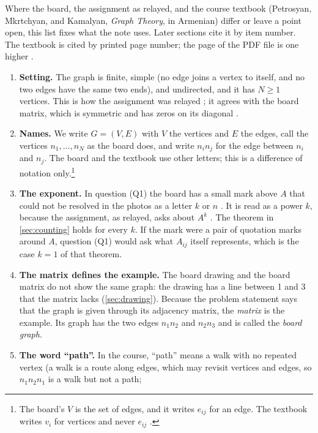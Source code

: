 Where the board, the assignment as relayed, and the course textbook
(Petrosyan, Mkrtchyan, and Kamalyan, \emph{Graph Theory}, in Armenian) differ
or leave a point open, this list fixes what the note uses. Later sections
cite it by item number. The textbook is cited by printed page number; the
page of the PDF file is one higher \cite{petrosyan2015graphs}.
\begin{enumerate}
\item\label{conv:setting} \textbf{Setting.} The graph is finite, simple (no
  edge joins a vertex to itself, and no two edges have the same two ends),
  and undirected, and it has $N\ge 1$ vertices. This is how the assignment
  was relayed \cite{userstatements}; it agrees with the board matrix, which
  is symmetric and has zeros on its diagonal \cite{whiteboard1}.
\item\label{conv:names} \textbf{Names.} We write $G=(V,E)$ with $V$ the
  vertices and $E$ the edges, call the vertices $n_1,\dots,n_N$ as the board
  does, and write $n_in_j$ for the edge between $n_i$ and $n_j$. The board
  and the textbook use other letters; this is a difference of notation
  only.\footnote{The board's $V$ is the set of edges, and it writes $e_{ij}$
  for an edge. The textbook writes $v_i$ for vertices and never $e_{ij}$
  \cite[p.~9]{petrosyan2015graphs}.}
\item\label{conv:power} \textbf{The exponent.} In question (Q1) the board has
  a small mark above $A$ that could not be resolved in the photos as a
  letter $k$ or $n$ \cite{whiteboard1}. It is read as a power $k$, because
  the assignment, as relayed, asks about $A^k$ \cite{userstatements}. The
  theorem in \cref{sec:counting} holds for every $k$. If the mark were a
  pair of quotation marks around $A$, question (Q1) would ask what $A_{ij}$
  itself represents, which is the case $k=1$ of that theorem.
\item\label{conv:drawing} \textbf{The matrix defines the example.} The
  board drawing and the board matrix do not show the same graph: the drawing has a line between 1 and 3 that
  the matrix lacks (\cref{sec:drawing}). Because the problem statement says that the graph is
  given through its adjacency matrix, the \emph{matrix} is the example. Its
  graph has the two edges $n_1n_2$ and $n_2n_3$ and is called the
  \emph{board graph}.
\item\label{conv:path} \textbf{The word ``path''.} In the course, ``path''
  means a walk with no repeated vertex (a walk is a route along edges, which
  may revisit vertices and edges, so $n_1n_2n_1$ is a walk but not a path;

\end{enumerate}
